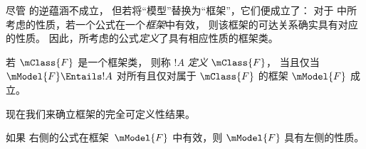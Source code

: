 \documentclass[../../../include/open-logic-section]{subfiles}
\begin{document}



尽管  的逆蕴涵不成立，
但若将“模型”替换为“框架”，它们便成立了：
对于  中所考虑的性质，若一个公式在一个\emph{框架}中有效，
则该框架的可达关系确实具有对应的性质。
因此，所考虑的公式\emph{定义}了具有相应性质的框架类。

\begin{defn}
  若 $\mClass{F}$ 是一个框架类，
  则称 $!A$ \emph{定义} $\mClass{F}$，
  当且仅当 $\mModel{F} \Entails !A$ 对所有且仅对属于 $\mClass{F}$ 的框架 $\mModel{F}$ 成立。
\end{defn}

现在我们来确立框架的完全可定义性结果。

\begin{thm}
如果  右侧的公式在框架~$\mModel{F}$ 中有效，则 $\mModel{F}$ 具有左侧的性质。
\end{thm}
\end{document}
